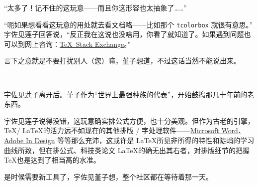 “太多了！记不住的这玩意——而且你这形容也太抽象了……”

“呃如果想看看这玩意的用处就去看文档咯——比如那个 \verb"tcolorbox" 就很有意思。” 宇佐见莲子回答说，“反正我在这说也没啥用，你看了就知道了。如果遇到问题也可以到网上咨询：\href{https://tex.stackexchange.com}{\TeX\ Stack Exchange}。”

言下之意就是不要打扰别人（您）嘛，堇子想道，不过这话当然不能说出来。

~

宇佐见莲子离开后。堇子作为“世界上最强种族的代表”，开始鼓捣那几十年前的老东西。

宇佐见莲子说得没错，这玩意确实排公式方便，也十分美观。但作为古老的引擎，\TeX / \LaTeX 的活力远不如现在的其他排版 / 字处理软件——\href{https://www.microsoft.com/en-us/microsoft-365/word}{Microsoft Word}、\href{https://www.adobe.com/products/indesign.html}{Adobe In Design} 等等那么充沛，这或许是 \LaTeX 所见非所得的特性和陡峭的学习曲线所致，但在排公式、科技类论文 \LaTeX 的确无出其右者，对排版细节的把握 \TeX 也是达到了相当高的水准。

是时候需要新工具了，宇佐见堇子想，整个社区都在等待着那一天。
